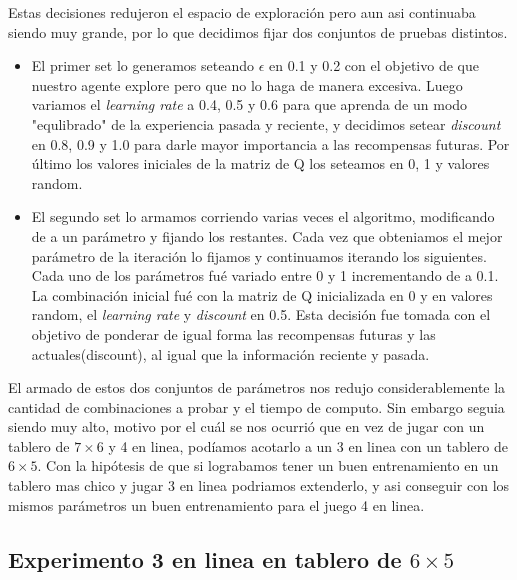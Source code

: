 Estas decisiones redujeron el espacio de exploración pero aun asi continuaba siendo muy grande, por lo que decidimos fijar dos conjuntos de pruebas distintos.

\begin{itemize}
  \item El primer set lo generamos seteando \textbf{$\epsilon$} en 0.1 y 0.2 con el objetivo de que nuestro agente explore pero que no lo haga de manera excesiva. Luego variamos el \textit{learning rate} a 0.4, 0.5 y 0.6 para que aprenda de un modo "equlibrado" de la experiencia pasada y reciente,
  y decidimos setear \textit{discount} en 0.8, 0.9 y 1.0 para darle mayor importancia a las recompensas futuras. Por último los valores iniciales de la matriz de Q los seteamos en 0, 1 y valores random.

  \item  El segundo set lo armamos corriendo varias veces el algoritmo, modificando de a un parámetro y fijando los restantes. Cada vez que obteniamos el mejor parámetro de la iteración lo fijamos y continuamos iterando los siguientes. Cada uno de los parámetros fué variado entre 0 y 1 incrementando de a 0.1.
   La combinación inicial fué con la matriz de Q inicializada en 0 y en valores random, el \textit{learning rate} y \textit{discount} en 0.5. Esta decisión fue tomada con el objetivo de ponderar de igual forma las recompensas futuras y las actuales(discount), al igual que la información reciente y pasada. \\
\end{itemize}

El armado de estos dos conjuntos de parámetros nos redujo considerablemente la cantidad de combinaciones a probar y el tiempo de computo. Sin embargo seguia siendo muy alto, motivo por el cuál se nos ocurrió que en vez de jugar con un tablero de $7\times6$ y 4 en linea, podíamos acotarlo a un 3 en linea con un tablero de $6\times5$. Con la hipótesis de que si lograbamos tener un buen entrenamiento en un tablero mas chico y jugar 3 en linea podriamos extenderlo, y asi
 conseguir con los mismos parámetros un buen entrenamiento para el juego 4 en linea.



\subsection{Experimento 3 en linea en tablero de $6\times5$}

